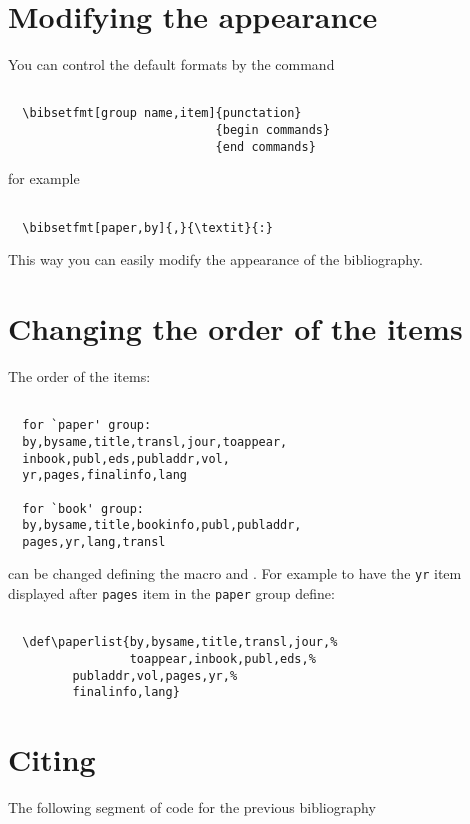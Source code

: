 \documentclass[a4paper,final,11pt]{article}
\begin{document}
\section{Modifying the appearance}
You can control the default formats by the command
\begin{verbatim}

  \bibsetfmt[group name,item]{punctation}
                             {begin commands}
                             {end commands}

\end{verbatim}
for example
\begin{verbatim}

  \bibsetfmt[paper,by]{,}{\textit}{:}

\end{verbatim}
This way you can easily modify the appearance of the
bibliography.

\section{Changing the order of the items}
The order of the items:
\begin{verbatim}

  for `paper' group:
  by,bysame,title,transl,jour,toappear,
  inbook,publ,eds,publaddr,vol,
  yr,pages,finalinfo,lang
  
  for `book' group:
  by,bysame,title,bookinfo,publ,publaddr,
  pages,yr,lang,transl

\end{verbatim}
can be changed defining the macro  and
. For example to have the \verb|yr| item 
displayed after \verb|pages| item in the \verb|paper| group define:
\begin{verbatim}

  \def\paperlist{by,bysame,title,transl,jour,%
                 toappear,inbook,publ,eds,%
		 publaddr,vol,pages,yr,%
		 finalinfo,lang}

\end{verbatim}


\section{Citing}
The following segment of code
for the previous bibliography
\end{document}
